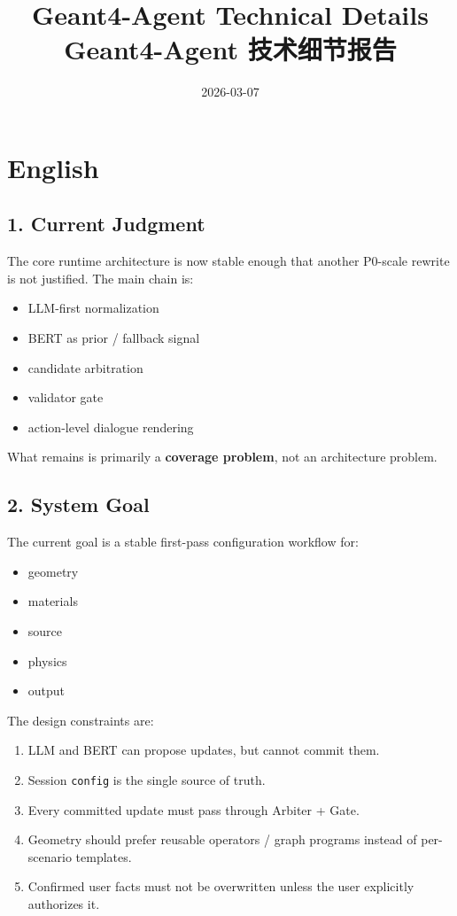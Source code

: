 \documentclass[11pt,a4paper]{ctexart}
\title{Geant4-Agent Technical Details\\Geant4-Agent 技术细节报告}
\author{}
\date{2026-03-07}
\begin{document}
\maketitle

\section*{English}

\subsection*{1. Current Judgment}

The core runtime architecture is now stable enough that another P0-scale rewrite is not justified. The main chain is:

\begin{itemize}
\item LLM-first normalization
\item BERT as prior / fallback signal
\item candidate arbitration
\item validator gate
\item action-level dialogue rendering
\end{itemize}

What remains is primarily a \textbf{coverage problem}, not an architecture problem.

\subsection*{2. System Goal}

The current goal is a stable first-pass configuration workflow for:

\begin{itemize}
\item geometry
\item materials
\item source
\item physics
\item output
\end{itemize}

The design constraints are:

\begin{enumerate}
\item LLM and BERT can propose updates, but cannot commit them.
\item Session \texttt{config} is the single source of truth.
\item Every committed update must pass through Arbiter + Gate.
\item Geometry should prefer reusable operators / graph programs instead of per-scenario templates.
\item Confirmed user facts must not be overwritten unless the user explicitly authorizes it.
\end{enumerate}
\end{document}
